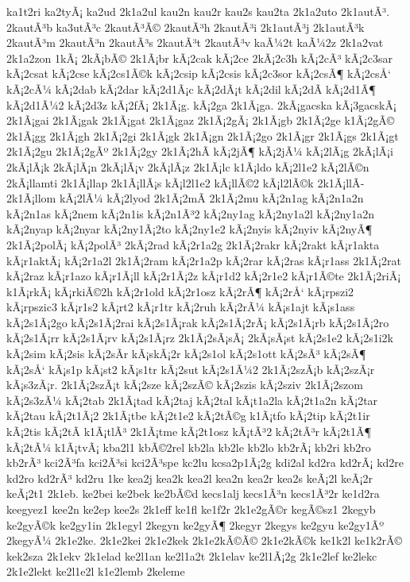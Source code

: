 {ka1t2ri
ka2tyÃ¡
ka2ud
2k1a2ul
kau2n
kau2r
kau2s
kau2ta
2k1a2uto
2k1autÃ³.
2kautÃ³b
ka3utÃ³c
2kautÃ³Ã©
2kautÃ³h
2kautÃ³i
2k1autÃ³j
2k1autÃ³k
2kautÃ³m
2kautÃ³n
2kautÃ³s
2kautÃ³t
2kautÃ³v
kaÃ¼2t
kaÃ¼2z
2k1a2vat
2k1a2zon
1kÃ¡
2kÃ¡bÃ©
2k1Ã¡br
kÃ¡2cak
kÃ¡2ce
2kÃ¡2c3h
kÃ¡2cÃ³
kÃ¡2c3sar
kÃ¡2csat
kÃ¡2cse
kÃ¡2cs1Ã©k
kÃ¡2csip
kÃ¡2csis
kÃ¡2c3sor
kÃ¡2csÃ¶
kÃ¡2csÅ‘
kÃ¡2cÃ¼
kÃ¡2dab
kÃ¡2dar
kÃ¡2d1Ã¡c
kÃ¡2dÃ¡t
kÃ¡2dil
kÃ¡2dÃ­
kÃ¡2d1Ã¶
kÃ¡2d1Ã¼2
kÃ¡2d3z
kÃ¡2fÃ¡
2k1Ã¡g.
kÃ¡2ga
2k1Ã¡ga.
2kÃ¡gacska
kÃ¡3gacskÃ¡
2k1Ã¡gai
2k1Ã¡gak
2k1Ã¡gat
2k1Ã¡gaz
2k1Ã¡2gÃ¡
2k1Ã¡gb
2k1Ã¡2ge
k1Ã¡2gÃ©
2k1Ã¡gg
2k1Ã¡gh
2k1Ã¡2gi
2k1Ã¡gk
2k1Ã¡gn
2k1Ã¡2go
2k1Ã¡gr
2k1Ã¡gs
2k1Ã¡gt
2k1Ã¡2gu
2k1Ã¡2gÃº
2k1Ã¡2gy
2k1Ã¡2hÃ­
kÃ¡2jÃ¶
kÃ¡2jÃ¼
kÃ¡2lÃ¡g
2kÃ¡lÃ¡i
2kÃ¡lÃ¡k
2kÃ¡lÃ¡n
2kÃ¡lÃ¡v
2kÃ¡lÃ¡z
2k1Ã¡lc
k1Ã¡ldo
kÃ¡2l1e2
kÃ¡2lÃ©n
2kÃ¡llamti
2k1Ã¡llap
2k1Ã¡llÃ¡s
kÃ¡l2l1e2
kÃ¡llÃ©2
kÃ¡l2lÃ©k
2k1Ã¡llÃ­
2k1Ã¡llom
kÃ¡2lÃ¼
kÃ¡2lyod
2k1Ã¡2mÃ­
2k1Ã¡2mu
kÃ¡2n1ag
kÃ¡2n1a2n
kÃ¡2n1as
kÃ¡2nem
kÃ¡2n1is
kÃ¡2n1Ã³2
kÃ¡2ny1ag
kÃ¡2ny1a2l
kÃ¡2ny1a2n
kÃ¡2nyap
kÃ¡2nyar
kÃ¡2ny1Ã¡2to
kÃ¡2ny1e2
kÃ¡2nyis
kÃ¡2nyiv
kÃ¡2nyÃ¶
2k1Ã¡2polÃ¡
kÃ¡2polÃ³
2kÃ¡2rad
kÃ¡2r1a2g
2k1Ã¡2rakr
kÃ¡2rakt
kÃ¡r1akta
kÃ¡r1aktÃ¡
kÃ¡2r1a2l
2k1Ã¡2ram
kÃ¡2r1a2p
kÃ¡2rar
kÃ¡2ras
kÃ¡r1ass
2k1Ã¡2rat
kÃ¡2raz
kÃ¡r1azo
kÃ¡r1Ã¡ll
kÃ¡2r1Ã¡2z
kÃ¡r1d2
kÃ¡2r1e2
kÃ¡r1Ã©te
2k1Ã¡2riÃ¡
k1Ã¡rkÃ¡
kÃ¡rkiÃ©2h
kÃ¡2r1old
kÃ¡2r1osz
kÃ¡2rÃ¶
kÃ¡2rÅ‘
kÃ¡rpszi2
kÃ¡rpszic3
kÃ¡r1s2
kÃ¡rt2
kÃ¡r1tr
kÃ¡2ruh
kÃ¡2rÃ¼
kÃ¡s1ajt
kÃ¡s1ass
kÃ¡2s1Ã¡2go
kÃ¡2s1Ã¡2rai
kÃ¡2s1Ã¡rak
kÃ¡2s1Ã¡2rÃ¡
kÃ¡2s1Ã¡rb
kÃ¡2s1Ã¡2ro
kÃ¡2s1Ã¡rr
kÃ¡2s1Ã¡rv
kÃ¡2s1Ã¡rz
2k1Ã¡2sÃ¡sÃ¡
2kÃ¡sÃ¡st
kÃ¡2s1e2
kÃ¡2s1i2k
kÃ¡2sim
kÃ¡2sis
kÃ¡2sÃ­r
kÃ¡skÃ¡2r
kÃ¡2s1ol
kÃ¡2s1ott
kÃ¡2sÃ³
kÃ¡2sÃ¶
kÃ¡2sÅ‘
kÃ¡s1p
kÃ¡st2
kÃ¡s1tr
kÃ¡2sut
kÃ¡2s1Ã¼2
2k1Ã¡2szÃ¡b
kÃ¡2szÃ¡r
kÃ¡s3zÃ¡r.
2k1Ã¡2szÃ¡t
kÃ¡2sze
kÃ¡2szÃ©
kÃ¡2szis
kÃ¡2sziv
2k1Ã¡2szom
kÃ¡2s3zÃ¼
kÃ¡2tab
2k1Ã¡tad
kÃ¡2taj
kÃ¡2tal
kÃ¡t1a2la
kÃ¡2t1a2n
kÃ¡2tar
kÃ¡2tau
kÃ¡2t1Ã¡2
2k1Ã¡tbe
kÃ¡2t1e2
kÃ¡2tÃ©g
k1Ã¡tfo
kÃ¡2tip
kÃ¡2t1ir
kÃ¡2tis
kÃ¡2tÃ­
k1Ã¡tlÃ³
2k1Ã¡tme
kÃ¡2t1osz
kÃ¡tÃ³2
kÃ¡2tÃ³r
kÃ¡2t1Ã¶
kÃ¡2tÃ¼
k1Ã¡tvÃ¡
kba2l1
kbÃ©2rel
kb2la
kb2le
kb2lo
kb2rÃ¡
kb2ri
kb2ro
kb2rÃ³
kci2Ã³fa
kci2Ã³si
kci2Ã³spe
kc2lu
kcsa2p1Ã¡2g
kdi2al
kd2ra
kd2rÃ¡
kd2re
kd2ro
kd2rÃ³
kd2ru
1ke
kea2j
kea2k
kea2l
kea2n
kea2r
kea2s
keÃ¡2l
keÃ¡2r
keÃ¡2t1
2k1eb.
ke2bei
ke2bek
ke2bÃ©d
kecs1alj
kecs1Ã³n
kecs1Ã³2r
ke1d2ra
keegyez1
kee2n
ke2ep
kee2s
2k1eff
ke1fl
ke1f2r
2k1e2gÃ©r
kegÃ©sz1
2kegyb
ke2gyÃ©k
ke2gy1in
2k1egyl
2kegyn
ke2gyÃ¶
2kegyr
2kegys
ke2gyu
ke2gy1Ãº
2kegyÃ¼
2k1e2ke.
2k1e2kei
2k1e2kek
2k1e2kÃ©Ã©
2k1e2kÃ©k
ke1k2l
ke1k2rÃ©
kek2sza
2k1ekv
2k1elad
ke2l1an
ke2l1a2t
2k1elav
ke2l1Ã¡2g
2k1e2lef
ke2lekc
2k1e2lekt
ke2l1e2l
k1e2lemb
2keleme
}
